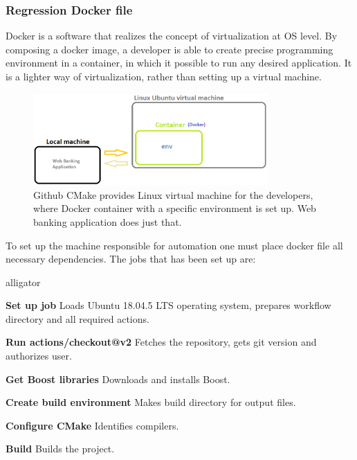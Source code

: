 \documentclass[a4paper,12pt]{book}
\newcommand\tab[1][1cm]{\hspace*{#1}}
\begin{document}
\subsubsection{Regression Docker file}
{
\tab Docker is a software that realizes the concept of virtualization at OS level. By composing a docker image, a developer is able to create precise programming environment in a container, in which it possible to run any desired application. It is a lighter way of virtualization, rather than setting up a virtual machine.      

\begin{figure}[H]
  \centering
    \includegraphics[width=0.8\textwidth]{scheme}
    \caption{Github CMake provides Linux virtual machine for the developers, where Docker container with a specific environment is set up. Web banking application does just that.}
\end{figure} 
    
\bigskip 
To set up the machine responsible for automation one must place docker file all necessary dependencies. The jobs that has been set up are: 
    
\begin{labeling}{alligator}
\item [\textbf{Set up job}] Loads Ubuntu 18.04.5 LTS operating system, prepares workflow directory and all required actions.

\item [\textbf{Run actions/checkout@v2}] Fetches the repository, gets git version and authorizes user.

\item [\textbf{Get Boost libraries}] Downloads and installs Boost.

\item [\textbf{Create build environment}] Makes build directory for output files.

\item [\textbf{Configure CMake}] Identifies compilers.

\item [\textbf{Build}] Builds the project.


\end{labeling}}
\end{document}
